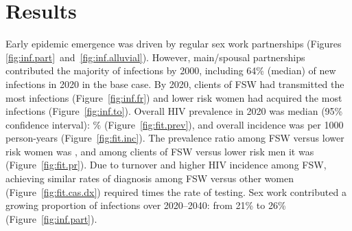 \clearpage
\section{Results}\label{res}
Early epidemic emergence was driven by regular sex work partnerships
(Figures \ref{fig:inf.part}~and~\ref{fig:inf.alluvial}).
However, main/spousal partnerships contributed the majority of infections by 2000, %
including 64\% (median) of new infections in 2020 in the base case. %
By 2020, clients of FSW had transmitted the most infections (Figure~\ref{fig:inf.fr})
and lower risk women had acquired the most infections (Figure~\ref{fig:inf.to}).
Overall HIV prevalence in 2020 was median (95\% confidence interval):
\% (Figure~\ref{fig:fit.prev}),
and overall incidence was  per 1000 person-years (Figure~\ref{fig:fit.inc}).
The prevalence ratio among FSW versus lower risk women was ,
and among clients of FSW versus lower risk men it was  (Figure~\ref{fig:fit.pr}).
Due to turnover and higher HIV incidence among FSW,
achieving similar rates of diagnosis among FSW versus other women (Figure~\ref{fig:fit.cas.dx})
required  times the rate of testing.
Sex work contributed a growing proportion of infections
over 2020--2040: from 21\% to 26\% (Figure~\ref{fig:inf.part}). %

